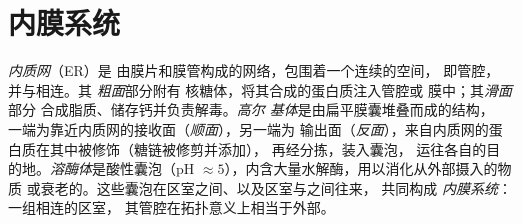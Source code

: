 \section{内膜系统}

\begin{definition}\label{def:b1:eukaryotic-cell:endomembrane}
\emph{内质网}（ER）是
由膜片和膜管构成的网络，包围着一个连续的空间，
即管腔，并与相连。其
\emph{粗面}部分附有
核糖体，将其合成的蛋白质注入管腔或
膜中；其\emph{滑面}部分
合成脂质、储存钙并负责解毒。\emph{高尔
基体}是由扁平膜囊堆叠而成的结构，
一端为靠近内质网的接收面（\emph{顺面}），另一端为
输出面（\emph{反面}），来自内质网的蛋白质在其中被修饰（糖链被修剪并添加），
再经分拣，装入囊泡，
运往各自的目的地。\emph{溶酶体}是酸性囊泡（pH
$\approx 5$），内含大量水解酶，用以消化从外部摄入的物质
或衰老的。这些囊泡在区室之间、以及区室与之间往来，
共同构成
\emph{内膜系统}：一组相连的区室，
其管腔在拓扑意义上相当于外部。
\end{definition}

